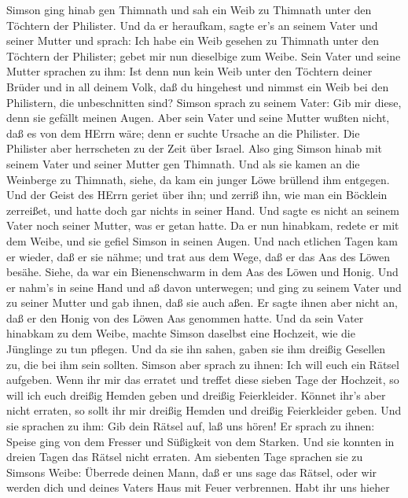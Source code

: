  Simson ging hinab gen Thimnath und sah ein Weib zu Thimnath
unter den Töchtern der Philister.  Und da er heraufkam,
sagte er's an seinem Vater und seiner Mutter und sprach: Ich habe ein
Weib gesehen zu Thimnath unter den Töchtern der Philister; gebet mir nun
dieselbige zum Weibe.  Sein Vater und seine Mutter sprachen
zu ihm: Ist denn nun kein Weib unter den Töchtern deiner Brüder und in
all deinem Volk, daß du hingehest und nimmst ein Weib bei den
Philistern, die unbeschnitten sind? Simson sprach zu seinem Vater: Gib
mir diese, denn sie gefällt meinen Augen.  Aber sein Vater
und seine Mutter wußten nicht, daß es von dem HErrn wäre; denn er suchte
Ursache an die Philister. Die Philister aber herrscheten zu der Zeit
über Israel.  Also ging Simson hinab mit seinem Vater und
seiner Mutter gen Thimnath. Und als sie kamen an die Weinberge zu
Thimnath, siehe, da kam ein junger Löwe brüllend ihm entgegen.
 Und der Geist des HErrn geriet über ihn; und zerriß ihn,
wie man ein Böcklein zerreißet, und hatte doch gar nichts in seiner
Hand. Und sagte es nicht an seinem Vater noch seiner Mutter, was er
getan hatte.  Da er nun hinabkam, redete er mit dem Weibe,
und sie gefiel Simson in seinen Augen.  Und nach etlichen
Tagen kam er wieder, daß er sie nähme; und trat aus dem Wege, daß er das
Aas des Löwen besähe. Siehe, da war ein Bienenschwarm in dem Aas des
Löwen und Honig.  Und er nahm's in seine Hand und aß davon
unterwegen; und ging zu seinem Vater und zu seiner Mutter und gab ihnen,
daß sie auch aßen. Er sagte ihnen aber nicht an, daß er den Honig von
des Löwen Aas genommen hatte.  Und da sein Vater hinabkam
zu dem Weibe, machte Simson daselbst eine Hochzeit, wie die Jünglinge zu
tun pflegen.  Und da sie ihn sahen, gaben sie ihm dreißig
Gesellen zu, die bei ihm sein sollten.  Simson aber sprach
zu ihnen: Ich will euch ein Rätsel aufgeben. Wenn ihr mir das erratet
und treffet diese sieben Tage der Hochzeit, so will ich euch dreißig
Hemden geben und dreißig Feierkleider.  Könnet ihr's aber
nicht erraten, so sollt ihr mir dreißig Hemden und dreißig Feierkleider
geben. Und sie sprachen zu ihm: Gib dein Rätsel auf, laß uns hören!
 Er sprach zu ihnen: Speise ging von dem Fresser und
Süßigkeit von dem Starken. Und sie konnten in dreien Tagen das Rätsel
nicht erraten.  Am siebenten Tage sprachen sie zu Simsons
Weibe: Überrede deinen Mann, daß er uns sage das Rätsel, oder wir werden
dich und deines Vaters Haus mit Feuer verbrennen. Habt ihr uns hieher
